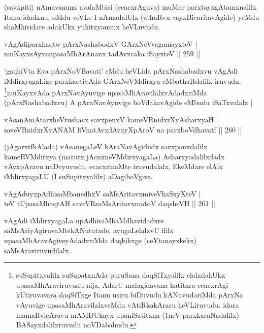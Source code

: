 \begin{artha}
(savxpiti) nAmavanunx avalaMbisi (ecacxrAguva) muMce parxtayxgAtamxnalilx Itanu idadxnu, oMdu veVLe I nAmadalUlx (athaRvu vayxBicaritavAgide) yeMdu shaMkisidare adakUkx yukitxyanunx heVLuvudu.
\end{artha}


\begin{shl}
vAgAdiparxkaqtw pArxNashabodxV GArxNeV\s vagamayxteV |\\
muKayxsAyxnupasaMhArAnanx tadAvxcaka iSayxteV \hfill || 259 ||
\end{shl}

\begin{artha}
`gaqhiVta Eva pArxNoVBavati' eMdu heVLida pArxNashabadxvu vAgAdi 
iMdirxyagaLige parxkaqtiyAda GArxNeVMdirxya eMbathaRdalilx iruvudu. 
\footnote{suSupitxyalilx suSupatxnAda puruSana daqSiTxyalilx elalxdakUkx upasaMhAraviruvudu nija, AdarU malagidavana hatitxra ecacxrAgi kUtiruvavara daqSiTxge Itanu usiru biDuvudu kANuvudariMda pArxNa vAyuvige upasaMhAravilalxveMdu vAtiRkakAraru heVLiruvudu. idara mamaRvicAravu mAMDUkayx upaniSatitxna (1neV parxkaraNadalilx) BASayxdalilxruvudu noVDabahudu.}muKayxvAda pArxNavAyuvige upasaMhAravilalxvAdadxriMda (pArxNashabadxvu) A pArxNavAyuvige boVdakavAgide eMbudu iSaTxvalalx |
\end{artha}

\begin{shl}
vAsanAmAtarxheVtushacx savxpenxV kameVRnidxrXyAsharxyaH |\\
saveVRnidxrXyANAM liVnatAvxdAvxyXpAroV na parxboVdhavatf \hfill || 260 ||
\end{shl}

\begin{artha}
(jAgarxtfkAlada) vAsanegaLeV kAraNavAgidudx savxpanxdalilx  kameRVMdirxya (matutx jAcnxneVMdirxyagaLa) Asharxyadalilxdadx vAyxpAravu naDeyuvudu, ecacxrinaMte iruvudalalx, EkeMdare elAlx iMdirxyagaLU (I suSupitxyalilx) aDagihoVgive.
\end{artha}

\begin{shl}
vAgAduyxpAdhisaMbanedhxV saMsAritavxmiveVkaSxyXteV |\\
teV tUpasaMhaqtAH saveVR\s saMsAritavxmatoV daqsheVH \hfill || 261 ||
\end{shl}

\begin{artha}
vAgAdi iMdirxyagaLa upAdhisaMbaMdhavidadxre saMsAriyAgiruvaMte\break kANutatxde, avugaLelalxvU ililx upasaMhAravAgiveyAdadxriMda daqkikxge (ceYtanayxkekx) saMsAraviruvudilalx.
\end{artha}

